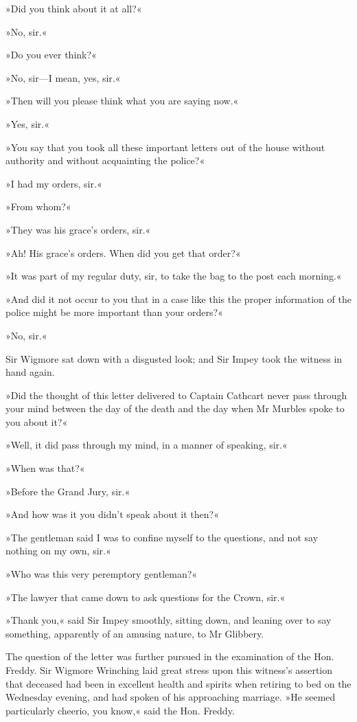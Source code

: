 »Did you think about it at all?«

»No, sir.«

»Do you ever think?«

»No, sir\allowbreak---\allowbreak I mean, yes, sir.«

»Then will you please think what you are saying now.«

»Yes, sir.«

»You say that you took all these important letters out of the house without authority and without acquainting the police?«

»I had my orders, sir.«

»From whom?«

»They was his grace's orders, sir.«

»Ah! His grace's orders. When did you get that order?«

»It was part of my regular duty, sir, to take the bag to the post each morning.«

»And did it not occur to you that in a case like this the proper information of the police might be more important than your orders?«

»No, sir.«

Sir Wigmore sat down with a disgusted look; and Sir Impey took the witness in hand again.

»Did the thought of this letter delivered to Captain Cathcart never pass through your mind between the day of the death and the day when Mr Murbles spoke to you about it?«

»Well, it did pass through my mind, in a manner of speaking, sir.«

»When was that?«

»Before the Grand Jury, sir.«

»And how was it you didn't speak about it then?«

»The gentleman said I was to confine myself to the questions, and not say nothing on my own, sir.«

»Who was this very peremptory gentleman?«

»The lawyer that came down to ask questions for the Crown, sir.«

»Thank you,« said Sir Impey smoothly, sitting down, and leaning over to say something, apparently of an amusing nature, to Mr Glibbery.

The question of the letter was further pursued in the examination of the Hon. Freddy. Sir Wigmore Wrinching laid great stress upon this witness's assertion that deceased had been in excellent health and spirits when retiring to bed on the Wednesday evening, and had spoken of his approaching marriage. »He seemed particularly cheerio, you know,« said the Hon. Freddy.

